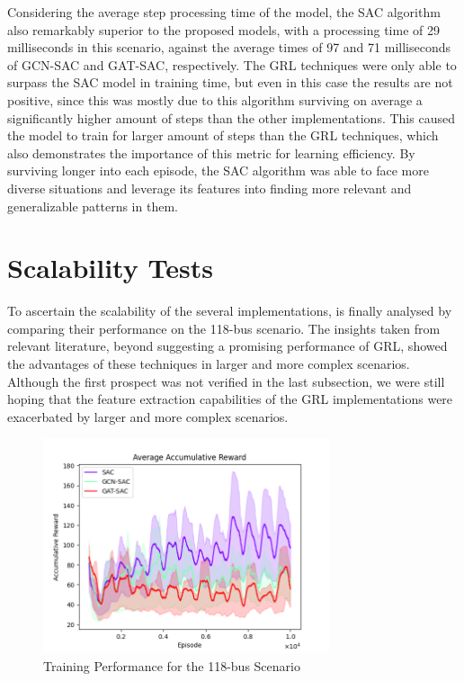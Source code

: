 Considering the average step processing time of the model, the \ac{SAC} algorithm also remarkably superior to the proposed models, with a processing time of 29 milliseconds in this scenario, against the average times of 97 and 71 milliseconds of GCN-SAC and GAT-SAC, respectively. The \ac{GRL} techniques were only able to surpass the \ac{SAC} model in training time, but even in this case the results are not positive, since this was mostly due to this algorithm surviving on average a significantly higher amount of steps than the other implementations. This caused the model to train for larger amount of steps than the \ac{GRL} techniques, which also demonstrates the importance of this metric for learning efficiency. By surviving longer into each episode, the \ac{SAC} algorithm was able to face more diverse situations and leverage its features into finding more relevant and generalizable patterns in them. 

\section{Scalability Tests} \label{sec:results-scalability}

To ascertain the scalability of the several implementations, is finally analysed by comparing their performance on the 118-bus scenario. The insights taken from relevant literature, beyond suggesting a promising performance of \ac{GRL}, showed the advantages of these techniques in larger and more complex scenarios. Although the first prospect was not verified in the last subsection, we were still hoping that the feature extraction capabilities of the \ac{GRL} implementations were exacerbated by larger and more complex scenarios. \par

\begin{figure}[ht]
	\includegraphics[width=0.75\textwidth]{graphs/118/acc_reward_train.png}
	\caption{Training Performance for the 118-bus Scenario}
	\label{fig:118-training-performance}
\end{figure}

